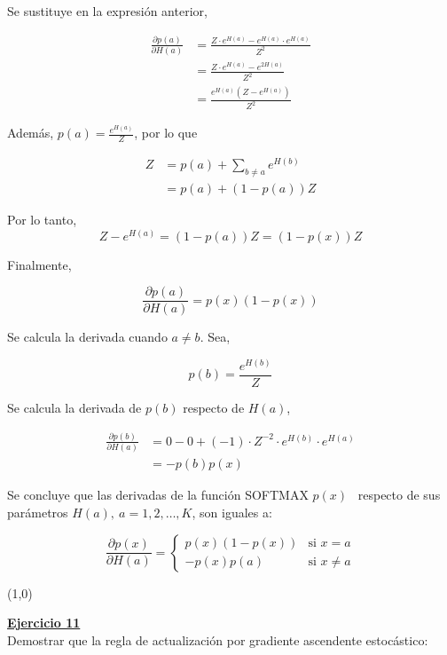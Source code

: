 \documentclass[12pt]{article}
\newlength\tindent
\renewcommand{\indent}{\hspace*{\tindent}}
\begin{document}
    Se sustituye en la expresión anterior,

    \begin{align*}
        \frac{\partial p(a)}{\partial H(a)} &= \frac{Z\cdot e^{H(a)} - e^{H(a)}\cdot e^{H(a)}}{Z^2} \\
        &= \frac{Z\cdot e^{H(a)} - e^{2H(a)}}{Z^2} \\
        &= \frac{e^{H(a)}(Z - e^{H(a)})}{Z^2}
    \end{align*}

    Además, $p(a) = \frac{e^{H(a)}}{Z}$, por lo que

    \begin{align*}
        Z &= p(a) + \sum_{b\neq a} e^{H(b)} \\
        &= p(a) + (1-p(a))Z
    \end{align*}

    Por lo tanto,
    \[
        Z - e^{H(a)} = (1-p(a))Z = (1-p(x))Z
    \]

    Finalmente,

    \[
        \frac{\partial p(a)}{\partial H(a)} = p(x)(1-p(x))
    \]

    Se calcula la derivada cuando $a\neq b$.
    Sea,

    \[
        p(b) = \frac{e^{H(b)}}{Z}
    \]

    Se calcula la derivada de $p(b)$ respecto de $H(a)$,

    \begin{align*}
        \frac{\partial p(b)}{\partial H(a)} &= 0 -0 + (-1) \cdot Z^{-2} \cdot e^{H(b)} \cdot e^{H(a)} \\
        &= -p(b)p(x)
    \end{align*}

    Se concluye que las derivadas de la función SOFTMAX $p(x)$~\cite{Sutton2018} respecto de sus parámetros $H(a),\ a=1,2,\dots,K$, son iguales a:

    \[
        \frac{\partial p(x)}{\partial H(a)} =
        \begin{cases}
            p(x)(1-p(x))    &\text{si $x = a$} \\
            -p(x)p(a)       &\text{si $x\neq a$}
        \end{cases}
    \]

    \line(1,0){\textwidth}

    \indent\underline{\textbf{Ejercicio 11}}\\
    Demostrar que la regla de actualización por gradiente ascendente estocástico:
\end{document}
